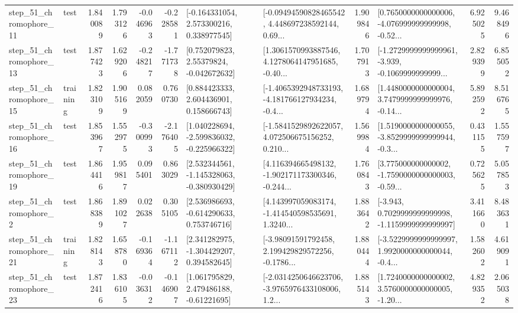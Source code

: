 \begin{tabular}{llrrrrllrlrr}
   step\_51\_chromophore\_11 &      test &      1.840089 &    1.793126 &     -0.046963 & -0.228581 &    [-0.164331054, 2.573300216, 0.338977545] &  [-0.09494590828465542, 4.448697238592144, 0.69... &       1.909846 &  [0.7650000000000006, -4.076999999999998, -0.52... &            6.925025 &          9.468496 \\
   step\_51\_chromophore\_13 &      test &      1.877423 &    1.629206 &     -0.248217 & -1.771738 &     [0.752079823, 2.55379824, -0.042672632] &  [1.3061570993887546, 4.1278064147951685, -0.40... &       1.707913 &  [-1.2729999999999961, -3.939, -0.1069999999999... &            2.829399 &          6.855052 \\
   step\_51\_chromophore\_15 &  training &      1.823109 &    1.905169 &      0.082059 &  0.760730 &     [0.884423333, 2.604436901, 0.158666743] &  [-1.4065392948733193, -4.181766127934234, -0.4... &       1.689794 &  [1.4480000000000004, 3.7479999999999976, -0.14... &            5.892592 &          8.516765 \\
   step\_51\_chromophore\_16 &      test &      1.853967 &    1.552975 &     -0.300993 & -2.176405 &   [1.040228694, -2.599836032, -0.225966322] &  [-1.5841529892622057, 4.072506675156252, 0.210... &       1.569984 &  [1.5190000000000055, -3.8529999999999944, -0.3... &            0.431155 &          1.557597 \\
   step\_51\_chromophore\_19 &      test &      1.864416 &    1.959817 &      0.095401 &  0.863029 &   [2.532344561, -1.145328063, -0.380930429] &  [4.116394665498132, -1.902171173300346, -0.244... &       1.760843 &  [3.775000000000002, -1.7590000000000003, -0.59... &            0.725625 &          5.057853 \\
    step\_51\_chromophore\_2 &      test &      1.868389 &    1.891027 &      0.022638 &  0.305105 &    [2.536986693, -0.614290633, 0.753746716] &  [4.143997059083174, -1.414540598535691, 1.3240... &       1.883642 &  [-3.943, 0.7029999999999998, -1.1159999999999997] &            3.411660 &          8.483631 \\
   step\_51\_chromophore\_21 &  training &      1.828143 &    1.658780 &     -0.169364 & -1.167112 &    [2.341282975, -1.304429207, 0.394582645] &  [-3.98091591792458, 2.199429829572256, -0.1786... &       1.880444 &  [-3.5229999999999997, 1.9920000000000044, -0.4... &            1.582602 &          4.619091 \\
   step\_51\_chromophore\_23 &      test &      1.872416 &    1.836105 &     -0.036312 & -0.146907 &     [1.061795829, 2.479486188, -0.61221695] &  [-2.0314250646623706, -3.9765976433108006, 1.2... &       1.885143 &  [1.7240000000000002, 3.5760000000000005, -1.20... &            4.829352 &          2.065038 \\

\end{tabular}
